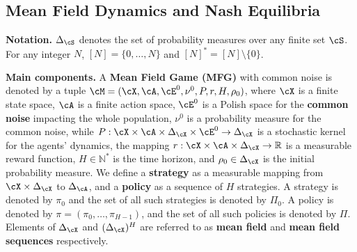 \documentclass{article}
\newcommand{\defi}[1]{{\bf #1}}
\theoremstyle{plain}
\begin{document}
\subsection{Mean Field Dynamics and Nash Equilibria} 

\noindent\textbf{Notation.} $\Delta_{\cS}$ denotes the set of probability measures over any finite set $\cS$. For any integer $N$, $[N] = \{0, \dots, N\}$ and $[N]^* = [N] \setminus \{0\}$.

\noindent\textbf{Main components.} 
A \defi{Mean Field Game (MFG)} with common noise is denoted by a tuple $\cM = (\cX, \cA, \cE^0, \nu^0, P, r, H, \rho_0)$, where $\cX$ is a finite state space, $\cA$ is a finite action space, $\cE^0$ is a Polish space for the \defi{common noise} impacting the whole population, $\nu^0$ is a probability measure for the common noise, while $P: \cX \times \cA \times \Delta_{\cX} \times \cE^0 \to \Delta_{\cX}$ is a stochastic kernel for the agents' dynamics, the mapping $r: \cX \times \cA \times \Delta_{\cX} \to \mathbb{R}$ is a measurable reward function, $H \in \mathbb{N}^*$ is the time horizon, and $\rho_0 \in \Delta_{\cX}$ is the initial probability measure. We define a \defi{strategy} as a measurable mapping from $\cX \times \Delta_{\cX}$ to $\Delta_{\cA}$, and a \defi{policy} as a sequence of $H$ strategies. A strategy is denoted by $\pi_0$ and the set of all such strategies is denoted by $\Pi_0$. A policy is denoted by $\pi = (\pi_0, \dots, \pi_{H-1})$, and the set of all such policies is denoted by $\Pi$. Elements of $\Delta_{\cX}$ and $(\Delta_{\cX})^H$ are referred to as \defi{mean field} and \defi{mean field sequences} respectively.
\end{document}
